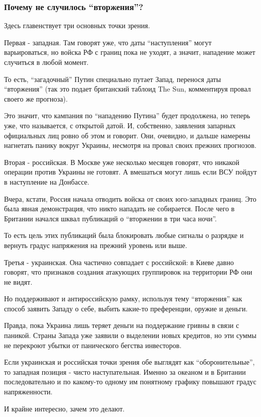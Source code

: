  
 
 
 
 

\subsubsection{Почему не случилось \enquote{вторжения}?}
\label{sec:16_02_2022.stz.news.ua.strana.3.putin_ne_napal_infvojna.2.pochemu_ne_sluchilos_vtorzhenia}

Здесь главенствует три основных точки зрения. 

Первая - западная. Там говорят уже, что даты \enquote{наступления} могут
варьироваться, но войска РФ с границ пока не уходят, а значит, нападение может
случиться в любой момент.

То есть, \enquote{загадочный} Путин специально путает Запад, перенося даты
\enquote{вторжения} (так это подает британский таблоид The Sun, комментируя
провал своего же прогноза). 

Это значит, что кампания по \enquote{нападению Путина} будет продолжена, но
теперь уже, что называется, с открытой датой. И, собственно, заявления запарных
официальных лиц ровно об этом и говорит. Они, очевидно, и дальше намерены
нагнетать панику вокруг Украины, несмотря на провал своих прежних прогнозов.

Вторая - российская. В Москве уже несколько месяцев говорят, что никакой
операции против Украины не готовят. А вмешаться могут лишь если ВСУ пойдут в
наступление на Донбассе. 

Вчера, кстати, Россия начала отводить войска от своих юго-западных границ. Это
была явная демонстрация, что никто нападать не собирается. После чего в
Британии начался шквал публикаций о \enquote{вторжении в три часа ночи}. 

То есть цель этих публикаций была блокировать любые сигналы о разрядке и
вернуть градус напряжения на прежний уровень или выше. 

Третья - украинская. Она частично совпадает с российской: в Киеве давно
говорят, что признаков создания атакующих группировок на территории РФ они не
видят.

Но поддерживают и антироссийскую рамку, используя тему \enquote{вторжения} как
способ заявить Западу о себе, выбить какие-то преференции, оружие и деньги. 

Правда, пока Украина лишь теряет деньги на поддержание гривны в связи с
паникой. Страны Запада уже заявили о выделении новых кредитов, но эти суммы не
перекроют убытки от панического бегства инвесторов. 

Если украинская и российская точки зрения обе выглядят как
\enquote{оборонительные}, то западная позиция - чисто наступательная. Именно за
океаном и в Британии последовательно и по какому-то одному им понятному графику
повышают градус напряженности. 

И крайне интересно, зачем это делают. 
